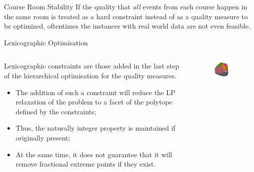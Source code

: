 \documentclass{beamer}
\begin{document}
\begin{frame}{Course Room Stability}
    If the quality that \emph{all} events from each course happen in the same room is treated as a hard constraint instead of as a quality measure to be optimized, oftentimes the instances with real world data are not even feasible.
\end{frame}

\begin{frame}{Lexicographic Optimisation}
  \begin{columns}[c]
      \begin{column}{.66\textwidth}
	Lexicographic constraints are those added in the last step of the hierarchical optimisation for the quality measures. 
	\begin{itemize}
	    \item The addition of such a constraint will reduce the LP relaxation of the problem to a facet of the polytope defined by the constraints;
	    \item Thus, the naturally integer property is maintained if originally present;
	    \item At the same time, it does not guarantee that it will remove fractional extreme points if they exist.
	\end{itemize}
      \end{column}
      \begin{column}{.33\textwidth}
	  \begin{figure}[h]
	      \centering
	      \includegraphics[width=0.8\textwidth]{polytope.png}
	  \end{figure}
      \end{column}
  \end{columns}
\end{frame}
\end{document}
